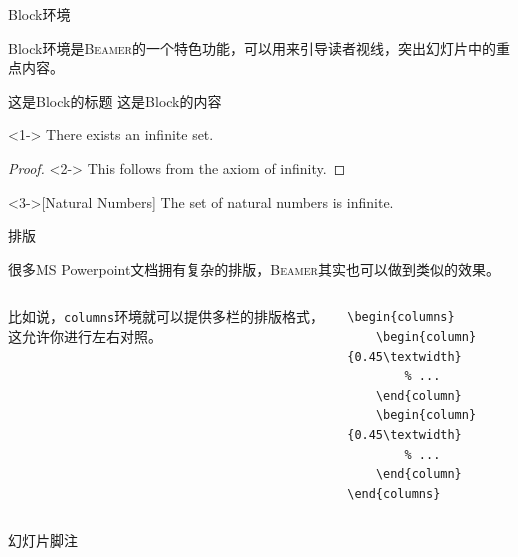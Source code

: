 \documentclass[aspectratio=169]{beamer}
\newcommand{\BibLaTeX}{\textsc{Bib}\LaTeX{}}
\newcommand{\Beamer}{\textsc{Beamer}}
\newcommand{\enableindent}{\setlength{\parskip}{6pt}\setlength{\parindent}{2em}}
\begin{document}
\begin{frame}{Block环境}

Block环境是\Beamer{}的一个特色功能，可以用来引导读者视线，突出幻灯片中的重点内容。

\begin{block}{这是Block的标题}
	这是Block的内容
\end{block}

\begin{theorem}<1->
There exists an infinite set.
\end{theorem}

\begin{proof}<2->
This follows from the axiom of infinity.
\end{proof}

\begin{example}<3->[Natural Numbers]
The set of natural numbers is infinite.
\end{example}

\end{frame}

\begin{frame}[fragile]{排版}
	\enableindent

	很多MS Powerpoint文档拥有复杂的排版，\Beamer{}其实也可以做到类似的效果。
	\begin{columns}
		\begin{column}{0.45\textwidth}
			比如说，\texttt{columns}环境就可以提供多栏的排版格式，这允许你进行左右对照。
		\end{column}
		\begin{column}{0.45\textwidth}
\begin{verbatim}
\begin{columns}
    \begin{column}{0.45\textwidth}
        % ...
    \end{column}
    \begin{column}{0.45\textwidth}
        % ...
    \end{column}
\end{columns}
\end{verbatim}
		\end{column}
	\end{columns}
\end{frame}

\begin{frame}[fragile]{幻灯片脚注}

\end{frame}
\end{document}
